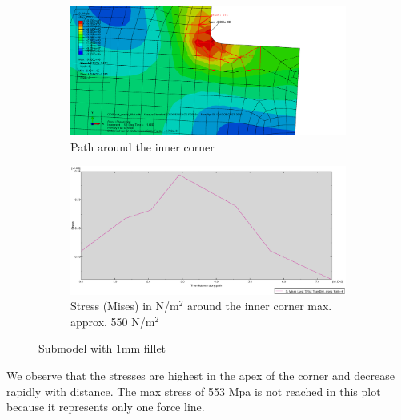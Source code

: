 \documentclass[12pt]{article}
\begin{document}
\begin{figure}[!htb]
  \centering
  \begin{subfigure}{.5\textwidth}
    \centering
    \includegraphics[width=0.95\linewidth]{pics/CPS8R_Fillet_Plot_Circle}
    \caption{Path around the inner corner}
  \end{subfigure}%
  \begin{subfigure}{.5\textwidth}
    \centering
    \includegraphics[width=0.95\linewidth]{pics/CPS8R_Fillet_Plot_Circle_Plot}
    \caption{Stress (Mises) in N/m$^{2}$ around the inner corner max. approx. 550 N/m$^{2}$}
   \end{subfigure}
  \caption{Submodel with 1mm fillet}
\end{figure}

We observe that the stresses are highest in the apex of the corner and decrease rapidly with 
distance. The max stress of 553 Mpa is not reached in this plot because it represents only one force line.
\end{document}
